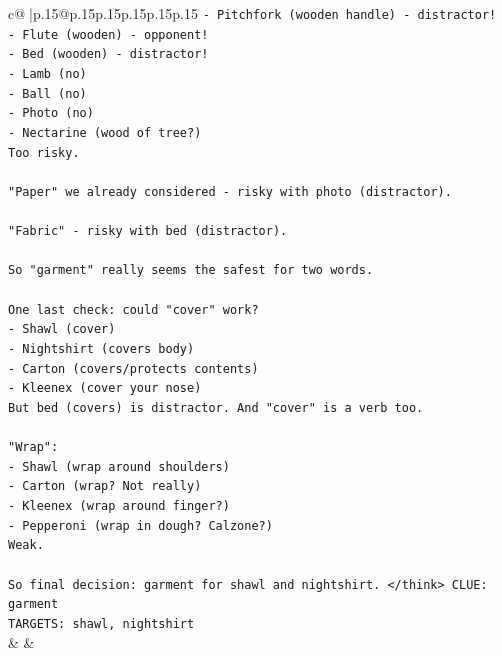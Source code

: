\documentclass{article}
\begin{document}
{\begin{supertabular}{c@{$\;$}|p{.15\linewidth}@{}p{.15\linewidth}p{.15\linewidth}p{.15\linewidth}p{.15\linewidth}p{.15\linewidth}}
{{{\texttt{{-} Pitchfork (wooden handle) {-} distractor!} \\
\texttt{{-} Flute (wooden) {-} opponent!} \\
\texttt{{-} Bed (wooden) {-} distractor!} \\
\texttt{{-} Lamb (no)} \\
\texttt{{-} Ball (no)} \\
\texttt{{-} Photo (no)} \\
\texttt{{-} Nectarine (wood of tree?)} \\
\texttt{Too risky.} \\
\\ 
\texttt{"Paper" we already considered {-} risky with photo (distractor).} \\
\\ 
\texttt{"Fabric" {-} risky with bed (distractor).} \\
\\ 
\texttt{So "garment" really seems the safest for two words.} \\
\\ 
\texttt{One last check: could "cover" work?} \\
\texttt{{-} Shawl (cover)} \\
\texttt{{-} Nightshirt (covers body)} \\
\texttt{{-} Carton (covers/protects contents)} \\
\texttt{{-} Kleenex (cover your nose)} \\
\texttt{But bed (covers) is distractor. And "cover" is a verb too.} \\
\\ 
\texttt{"Wrap":} \\
\texttt{{-} Shawl (wrap around shoulders)} \\
\texttt{{-} Carton (wrap? Not really)} \\
\texttt{{-} Kleenex (wrap around finger?)} \\
\texttt{{-} Pepperoni (wrap in dough? Calzone?)} \\
\texttt{Weak.} \\
\\ 
\texttt{So final decision: garment for shawl and nightshirt. </think> CLUE: garment} \\
\texttt{TARGETS: shawl, nightshirt} \\
            }
        }
    }
    & & \\ \\


\end{supertabular}}
\end{document}
